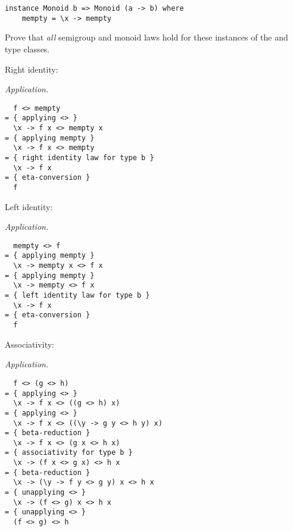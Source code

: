 \begin{parts}
\begin{verbatim}
instance Monoid b => Monoid (a -> b) where 
    mempty = \x -> mempty 
\end{verbatim}
    Prove that \emph{all} semigroup and monoid laws hold for these instances of the  and  type classes.
    \begin{subparts}
        \subpart[3] Right identity:   \droppoints
        
        \begin{solution}
            \emph{Application.}
\begin{verbatim}
  f <> mempty
= { applying <> }
  \x -> f x <> mempty x
= { applying mempty }
  \x -> f x <> mempty
= { right identity law for type b }
  \x -> f x
= { eta-conversion }
  f
\end{verbatim}
        \end{solution}
        
        \subpart[3] Left identity:  \droppoints
        
        \begin{solution}
            \emph{Application.}
\begin{verbatim}
  mempty <> f
= { applying mempty }
  \x -> mempty x <> f x
= { applying mempty }
  \x -> mempty <> f x
= { left identity law for type b }
  \x -> f x
= { eta-conversion }
  f
\end{verbatim}
        \end{solution}
        
        \subpart[5] Associativity:   \droppoints
        
        \begin{solution}
            \emph{Application.}
\begin{verbatim}
  f <> (g <> h)
= { applying <> }
  \x -> f x <> ((g <> h) x)
= { applying <> }
  \x -> f x <> ((\y -> g y <> h y) x)
= { beta-reduction }
  \x -> f x <> (g x <> h x)
= { associativity for type b }
  \x -> (f x <> g x) <> h x
= { beta-reduction }
  \x -> (\y -> f y <> g y) x <> h x
= { unapplying <> }
  \x -> (f <> g) x <> h x
= { unapplying <> }
  (f <> g) <> h
\end{verbatim}
        \end{solution}
    \end{subparts}
\end{parts}